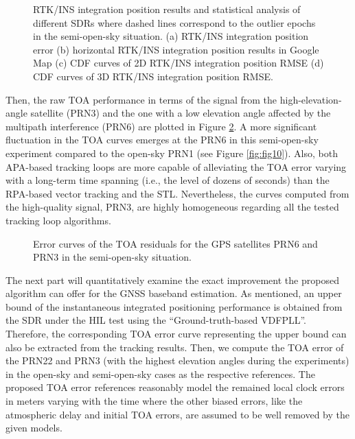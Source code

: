 \documentclass{article}
\newcommand{\reffig}[1]{Figure \ref{#1}}
\begin{document}
\begin{figure}[htbp]%
	\centering
	\hfil
	\hfil
	\hfil
	\caption{RTK/INS integration position results and statistical analysis of different SDRs where dashed lines correspond to the outlier epochs in the semi-open-sky situation. (a) RTK/INS integration position error (b) horizontal RTK/INS integration position results in Google Map (c) CDF curves of 2D RTK/INS integration position RMSE (d) CDF curves of 3D RTK/INS integration position RMSE. }%
	\label{fig:fig14}%
\end{figure}

Then, the raw TOA performance in terms of the signal from the high-elevation-angle satellite (PRN3) and the one with a low elevation angle affected by the multipath interference (PRN6) are plotted in \reffig{fig:fig15}. A more significant fluctuation in the TOA curves emerges at the PRN6 in this semi-open-sky experiment compared to the open-sky PRN1 (see \reffig{fig:fig10}). Also, both APA-based tracking loops are more capable of alleviating the TOA error varying with a long-term time spanning (i.e., the level of dozens of seconds) than the RPA-based vector tracking and the STL. Nevertheless, the curves computed from the high-quality signal, PRN3, are highly homogeneous regarding all the tested tracking loop algorithms.

\begin{figure}[htbp]%
\centering
{}%
\hfil
{}%
\hfil
{}%
\hfil
{}%
\caption{Error curves of the TOA residuals for the GPS satellites PRN6 and PRN3 in the semi-open-sky situation. }%
\label{fig:fig15}%
\end{figure}

The next part will quantitatively examine the exact improvement the proposed algorithm can offer for the GNSS baseband estimation. As mentioned, an upper bound of the instantaneous integrated positioning performance is obtained from the SDR under the HIL test using the ``Ground-truth-based VDFPLL''. Therefore, the corresponding TOA error curve representing the upper bound can also be extracted from the tracking results. Then, we compute the TOA error of the PRN22 and PRN3 (with the highest elevation angles during the experiments) in the open-sky and semi-open-sky cases as the respective references. The proposed TOA error references reasonably model the remained local clock errors in meters varying with the time where the other biased errors, like the atmospheric delay and initial TOA errors, are assumed to be well removed by the given models. 
\end{document}
